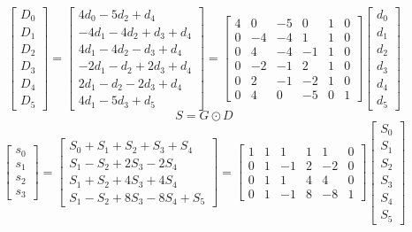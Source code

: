 \documentclass{article}%
\begin{document}
\[%
\left[\begin{matrix}D_{0}\\D_{1}\\D_{2}\\D_{3}\\D_{4}\\D_{5}\end{matrix}\right] = \left[\begin{matrix}4 d_{0} - 5 d_{2} + d_{4}\\- 4 d_{1} - 4 d_{2} + d_{3} + d_{4}\\4 d_{1} - 4 d_{2} - d_{3} + d_{4}\\- 2 d_{1} - d_{2} + 2 d_{3} + d_{4}\\2 d_{1} - d_{2} - 2 d_{3} + d_{4}\\4 d_{1} - 5 d_{3} + d_{5}\end{matrix}\right] = \left[\begin{matrix}4 & 0 & -5 & 0 & 1 & 0\\0 & -4 & -4 & 1 & 1 & 0\\0 & 4 & -4 & -1 & 1 & 0\\0 & -2 & -1 & 2 & 1 & 0\\0 & 2 & -1 & -2 & 1 & 0\\0 & 4 & 0 & -5 & 0 & 1\end{matrix}\right] \left[\begin{matrix}d_{0}\\d_{1}\\d_{2}\\d_{3}\\d_{4}\\d_{5}\end{matrix}\right]%
\]%
\[%
S = G \odot D%
\]%
\[%
\left[\begin{matrix}s_{0}\\s_{1}\\s_{2}\\s_{3}\end{matrix}\right] = \left[\begin{matrix}S_{0} + S_{1} + S_{2} + S_{3} + S_{4}\\S_{1} - S_{2} + 2 S_{3} - 2 S_{4}\\S_{1} + S_{2} + 4 S_{3} + 4 S_{4}\\S_{1} - S_{2} + 8 S_{3} - 8 S_{4} + S_{5}\end{matrix}\right] = \left[\begin{matrix}1 & 1 & 1 & 1 & 1 & 0\\0 & 1 & -1 & 2 & -2 & 0\\0 & 1 & 1 & 4 & 4 & 0\\0 & 1 & -1 & 8 & -8 & 1\end{matrix}\right] \left[\begin{matrix}S_{0}\\S_{1}\\S_{2}\\S_{3}\\S_{4}\\S_{5}\end{matrix}\right]%
\]%
\end{document}
